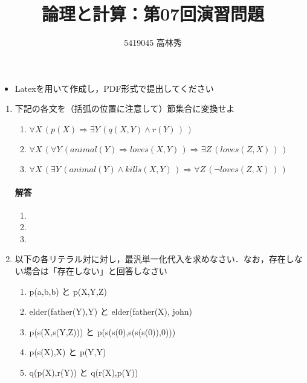 \documentclass[dvipdfmx]{jsarticle}
\def\NO{07}
\def\LECTURENAME{論理と計算}
\begin{document}
\title{\LECTURENAME{}：第\NO{}回演習問題}

\author{5419045 高林秀}

\date{}
\maketitle

\begin{itemize}
\item Latexを用いて作成し，PDF形式で提出してください
\end{itemize}


\vspace*{\baselineskip}

\begin{enumerate}\setlength{\itemsep}{\baselineskip}

\item 下記の各文を（括弧の位置に注意して）節集合に変換せよ
  \begin{enumerate}

  \item $\forall X\,( p(X)\Rightarrow \exists Y\,(q(X,Y)\land r(Y)\,)\,)$

  \item $\forall X\,( \forall Y\,(animal(Y)\Rightarrow loves(X,Y)\,)\Rightarrow \exists Z\,(loves(Z,X)\,)\,)$

  \item $\forall X\,( \exists Y\,(animal(Y)\land kills(X,Y)\,)\Rightarrow \forall Z\,( \neg loves(Z,X)\,)\,)$
  \end{enumerate}
  \paragraph{解答}
  \begin{enumerate}
    \item
    \item
    \item
  \end{enumerate}

\item 以下の各リテラル対に対し，最汎単一化代入を求めなさい．なお，存在しない場合は「存在しない」と回答しなさい

  \begin{enumerate}
  \item p(a,b,b) と p(X,Y,Z)
  \item elder(father(Y),Y) と elder(father(X), john)
  \item p(s(X,s(Y,Z))) と p(s(s(0),s(s(s(0)),0)))
  \item p(s(X),X) と p(Y,Y)
  \item q(p(X),r(Y)) と q(r(X),p(Y))
  \end{enumerate}

\end{enumerate}
\end{document}
